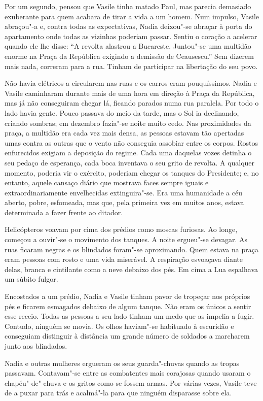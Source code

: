 Por um segundo, pensou que Vasile tinha matado Paul, mas parecia
demasiado exuberante para quem acabara de tirar a vida a um homem. Num
impulso, Vasile abraçou"-a e, contra todas as expectativas, Nadia
deixou"-se abraçar à porta do apartamento onde todas as vizinhas poderiam
passar. Sentiu o coração a acelerar quando ele lhe disse:
``A revolta alastrou a Bucareste. Juntou"-se uma multidão enorme na Praça
da República exigindo a demissão de
Ceausescu.'' Sem dizerem mais nada, correram para a rua. Tinham de
participar na libertação do seu povo.

Não havia elétricos a circularem nas ruas e os carros eram
pouquíssimos. Nadia e Vasile caminharam durante mais de uma hora em
direção à Praça da República, mas já não conseguiram chegar lá, ficando
parados numa rua paralela. Por todo o lado havia gente. Pouco passava do
meio da tarde, mas o Sol ia declinando, criando sombras; em dezembro
fazia"-se noite muito cedo. Nas proximidades da praça, a multidão era
cada vez mais densa, as pessoas estavam tão apertadas umas contra as
outras que o vento não conseguia assobiar entre os corpos. Rostos
enfurecidos exigiam a deposição do regime. Cada uma daquelas vozes
detinha o seu pedaço de esperança, cada boca inventava o seu grito de
revolta. A qualquer momento, poderia vir o exército, poderiam chegar
os tanques do Presidente; e, no entanto, aquele cansaço diário que
mostrava faces sempre iguais e extraordinariamente envelhecidas
extinguira"-se. Era uma humanidade a céu aberto, pobre, esfomeada, mas
que, pela primeira vez em muitos anos, estava determinada a fazer frente
ao ditador.

Helicópteros voavam por cima dos prédios como moscas furiosas. Ao longe, começou a ouvir"-se o movimento dos tanques. A
noite ergueu"-se devagar. As ruas ficaram negras e os blindados foram"-se
aproximando. Quem estava na praça eram pessoas com rosto e uma vida
miserável. A respiração esvoaçava diante delas, branca e cintilante como
a neve debaixo dos pés. Em cima a Lua espalhava um súbito fulgor.


Encostados a um prédio, Nadia e Vasile tinham pavor de tropeçar nos
próprios pés e ficarem esmagados debaixo de algum tanque. Não eram os
únicos a sentir esse receio. Todas as pessoas a seu lado tinham um medo
que as impelia a fugir. Contudo, ninguém se movia. Os olhos haviam"-se
habituado à escuridão e conseguiam distinguir à distância um grande
número de soldados a marcharem junto aos blindados.

Nadia e outras mulheres ergueram os seus guarda"-chuvas quando as tropas passavam. Contavam"-se entre as combatentes mais
corajosas quando usaram o chapéu"-de"-chuva e os gritos como se fossem armas. Por várias vezes, Vasile teve
de a puxar para trás e acalmá"-la para que ninguém disparasse sobre
ela.

